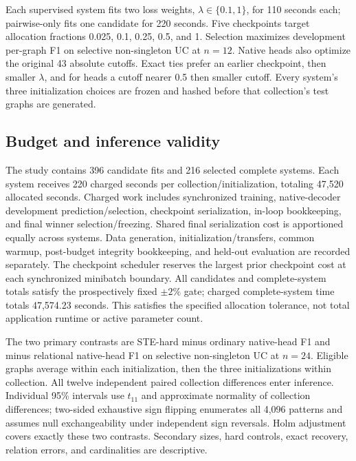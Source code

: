 Each supervised system fits two loss weights, $\lambda\in\{0.1,1\}$, for 110 seconds each; pairwise-only fits one candidate for 220 seconds. Five checkpoints target allocation fractions 0.025, 0.1, 0.25, 0.5, and 1. Selection maximizes development per-graph F1 on selective non-singleton UC at $n=12$. Native heads also optimize the original 43 absolute cutoffs. Exact ties prefer an earlier checkpoint, then smaller $\lambda$, and for heads a cutoff nearer 0.5 then smaller cutoff. Every system's three initialization choices are frozen and hashed before that collection's test graphs are generated.

\subsection{Budget and inference validity}
The study contains 396 candidate fits and 216 selected complete systems. Each system receives 220 charged seconds per collection/initialization, totaling 47,520 allocated seconds. Charged work includes synchronized training, native-decoder development prediction/selection, checkpoint serialization, in-loop bookkeeping, and final winner selection/freezing. Shared final serialization cost is apportioned equally across systems. Data generation, initialization/transfers, common warmup, post-budget integrity bookkeeping, and held-out evaluation are recorded separately. The checkpoint scheduler reserves the largest prior checkpoint cost at each synchronized minibatch boundary. All candidates and complete-system totals satisfy the prospectively fixed $\pm2\%$ gate; charged complete-system time totals 47,574.23 seconds. This satisfies the specified allocation tolerance, not total application runtime or active parameter count.

The two primary contrasts are STE-hard minus ordinary native-head F1 and minus relational native-head F1 on selective non-singleton UC at $n=24$. Eligible graphs average within each initialization, then the three initializations within collection. All twelve independent paired collection differences enter inference. Individual 95\% intervals use $t_{11}$ and approximate normality of collection differences; two-sided exhaustive sign flipping enumerates all 4,096 patterns and assumes null exchangeability under independent sign reversals. Holm adjustment covers exactly these two contrasts. Secondary sizes, hard controls, exact recovery, relation errors, and cardinalities are descriptive.

\begin{table}[ht]\centering\small

\caption{The separate frozen hard-UC primary family. Differences are STE-hard minus native heads at selective $n=24$. Both comparisons retain all twelve collection effects. Intervals are individual paired $t_{11}$ intervals; Holm covers the two exhaustive sign-flip tests.}\label{tab:hard-confirm-primary}
\end{table}


